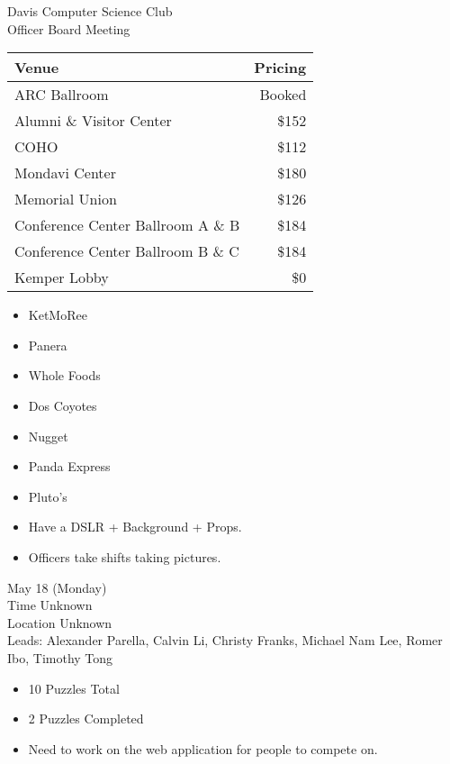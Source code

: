\documentclass{article}
\begin{document}
\begin{Minutes}{Davis Computer Science Club\\Officer Board Meeting}
\begin{table}[h]
	\setlength{\tabcolsep}{20pt}
	\renewcommand{\arraystretch}{1.5}
	\centering
	\begin{tabular}{| l | r |}
		\hline
		Venue
			&	Pricing\\
		\hline
		ARC	Ballroom
			&	Booked\\
		\hline
		Alumni \& Visitor Center
			&	\$152\\
		\hline
		COHO
			&	\$112\\
		\hline
		Mondavi Center
			&	\$180\\
		\hline
		Memorial Union
			&	\$126\\
		\hline
		Conference Center Ballroom A \& B
			&	\$184\\
		\hline
		Conference Center Ballroom B \& C
			&	\$184\\
		\hline
		Kemper Lobby
			&	\$0\\
		\hline
	\end{tabular}
\end{table}


\begin{itemize}
	\item KetMoRee
	\item Panera
	\item Whole Foods
	\item Dos Coyotes
	\item Nugget
	\item Panda Express
	\item Pluto's
\end{itemize}


\begin{itemize}
	\item Have a DSLR + Background + Props.
	\item Officers take shifts taking pictures.
\end{itemize}



May 18 (Monday)\\
Time Unknown\\
Location Unknown\\
Leads: Alexander Parella, Calvin Li, Christy Franks, Michael Nam Lee, Romer Ibo, Timothy Tong\\

\begin{itemize}
	\item 10 Puzzles Total
	\item 2 Puzzles Completed
	\item Need to work on the web application for people to compete on.
\end{itemize}


\end{Minutes}
\end{document}
